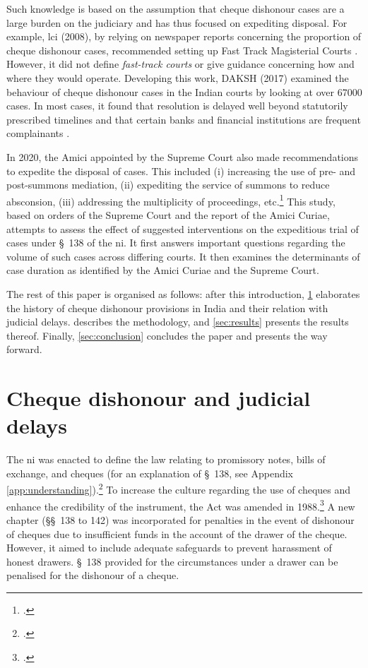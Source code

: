 Such knowledge is based on the assumption that cheque dishonour cases are a large burden on the judiciary and has thus focused on expediting disposal. For example, \gls{lci} (2008), by relying on newspaper reports concerning the proportion of cheque dishonour cases, recommended setting up Fast Track Magisterial Courts \autocite{lci2008_138, bhan2015_placing}. However, it did not define \textit{fast-track courts} or give guidance concerning how and where they would operate. Developing this work, DAKSH (2017) examined the behaviour of cheque dishonour cases in the Indian courts by looking at over 67000 cases. In most cases, it found that resolution is delayed well beyond statutorily prescribed timelines and that certain banks and financial institutions are frequent complainants \autocite{sridhar2017_cheque}.

In 2020, the Amici appointed by the Supreme Court also made recommendations to expedite the disposal of cases. This included (i) increasing the use of pre- and post-summons mediation, (ii) expediting the service of summons to reduce absconsion, (iii) addressing the multiplicity of proceedings, etc.\footcite[For details see ]{amicus2020_submission} This study, based on orders of the Supreme Court and the report of the Amici Curiae, attempts to assess the effect of suggested interventions on the expeditious trial of cases under \S~138 of the \gls{ni}. It first answers important questions regarding the volume of such cases across differing courts. It then examines the determinants of case duration as identified by the Amici Curiae and the Supreme Court.

The rest of this paper is organised as follows: after this introduction, \cref{sec:history} elaborates the history of cheque dishonour provisions in India and their relation with judicial delays.  describes the methodology, and \cref{sec:results} presents the results thereof. Finally, \cref{sec:conclusion} concludes the paper and presents the way forward.

\section{Cheque dishonour and judicial delays} \label{sec:history}

The \acrlong{ni} was enacted to define the law relating to promissory notes, bills of exchange, and cheques (for an explanation of \S~138, see Appendix \ref{app:understanding}).\footcite{ind1881_niAct} To increase the culture regarding the use of cheques and enhance the credibility of the instrument, the Act was amended in 1988.\footcite{niAmend1988} A new chapter (\S\S~138 to 142) was incorporated for penalties in the event of dishonour of cheques due to insufficient funds in the account of the drawer of the cheque. However, it aimed to include adequate safeguards to prevent harassment of honest drawers. \S~138 provided for the circumstances under a drawer can be penalised for the dishonour of a cheque.

